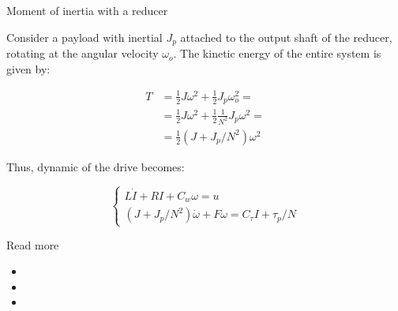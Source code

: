 \documentclass{beamer}
\begin{document}
\begin{frame}{Moment of inertia with a reducer}
	\begin{flushleft}
		
		Consider a payload with inertial $J_p$ attached to the output shaft of the reducer, rotating at the angular velocity $\omega_o$. The kinetic energy of the entire system is given by:
		
		\begin{align}
			T &= \frac{1}{2} J \omega^2 + \frac{1}{2} J_p \omega_o^2 = \\
			   &=\frac{1}{2} J \omega^2 + \frac{1}{2} \frac{1}{N^2} J_p \omega^2 = \\
			   &= \frac{1}{2} (J + J_p / N^2 )\omega^2
		\end{align}
	
		 Thus, dynamic of the drive becomes:
		 
		\begin{equation}
		\begin{cases}
			L \dot I + RI + C_w \omega = u \\
			(J + J_p / N^2) \dot \omega + F \omega = C_\tau I +  \tau_p / N
		\end{cases}
		\end{equation}		  
		
		
	\end{flushleft}
\end{frame}


\begin{frame}{Read more}
	\begin{flushleft}
		
		\begin{itemize}
			\item {}
			
			\item {}
			
			\item {}
			
			
			
		\end{itemize}
		
		
	\end{flushleft}
\end{frame}


\myqrframe
\end{document}
